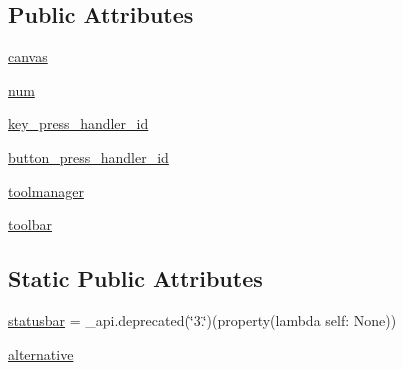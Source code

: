 \subsection*{Public Attributes}
\begin{DoxyCompactItemize}
\item 
\hyperlink{classmatplotlib_1_1backend__bases_1_1FigureManagerBase_ae355aa0633d6b4da5e2e698b007b4c3f}{canvas}
\item 
\hyperlink{classmatplotlib_1_1backend__bases_1_1FigureManagerBase_aba55ac119779c90c08e4034713892c63}{num}
\item 
\hyperlink{classmatplotlib_1_1backend__bases_1_1FigureManagerBase_adba106d5b61f941d29b215cb6b132fc0}{key\+\_\+press\+\_\+handler\+\_\+id}
\item 
\hyperlink{classmatplotlib_1_1backend__bases_1_1FigureManagerBase_af8f7fa62dd5340db8476b68907372740}{button\+\_\+press\+\_\+handler\+\_\+id}
\item 
\hyperlink{classmatplotlib_1_1backend__bases_1_1FigureManagerBase_a9ad94135cc8bb6c295fca4ceb9b46170}{toolmanager}
\item 
\hyperlink{classmatplotlib_1_1backend__bases_1_1FigureManagerBase_a77320bcdf3b2ba18ea1224b6aa020d2a}{toolbar}
\end{DoxyCompactItemize}
\subsection*{Static Public Attributes}
\begin{DoxyCompactItemize}
\item 
\hyperlink{classmatplotlib_1_1backend__bases_1_1FigureManagerBase_af963eb97f66b42737ff04e9be63d4e1e}{statusbar} = \+\_\+api.\+deprecated(\char`\"{}3.\char`\"{})(property(lambda self\+: None))
\item 
\hyperlink{classmatplotlib_1_1backend__bases_1_1FigureManagerBase_a572a48f598168a7972177f10602b2d60}{alternative}
\end{DoxyCompactItemize}


